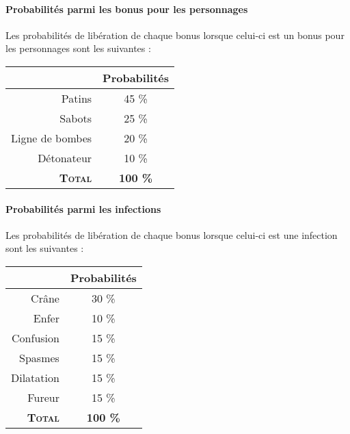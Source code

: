 \paragraph{Probabilités parmi les bonus pour les personnages}
Les probabilités de libération de chaque bonus lorsque celui-ci est un bonus pour les personnages sont les suivantes :\begin{center}
\begin{tabular}{|r|c|}
\hline 
& Probabilités \\ 
\hline 
Patins & 45 \% \\ 
\hline 
Sabots & 25 \% \\ 
\hline 
Ligne de bombes & 20 \% \\ 
\hline 
Détonateur & 10 \% \\ 
\hline 
\textbf{\textsc{Total}} & \textbf{100 \%} \\ 
\hline 
\end{tabular} 
\end{center}

\paragraph{Probabilités parmi les infections}
Les probabilités de libération de chaque bonus lorsque celui-ci est une infection sont les suivantes :\begin{center}
\begin{tabular}{|r|c|}
\hline 
& Probabilités \\ 
\hline 
Crâne & 30 \% \\ 
\hline 
Enfer & 10 \% \\ 
\hline 
Confusion & 15 \% \\ 
\hline 
Spasmes & 15 \% \\ 
\hline 
Dilatation & 15 \% \\ 
\hline 
Fureur & 15 \% \\ 
\hline 
\textbf{\textsc{Total}} & \textbf{100 \%} \\ 
\hline 
\end{tabular} 
\end{center}